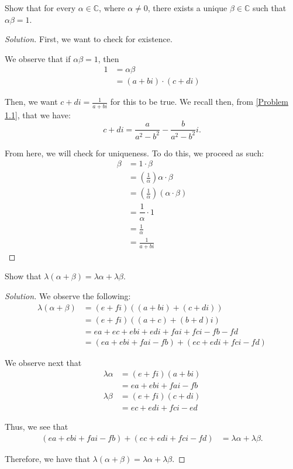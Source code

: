\documentclass[openany]{book}
\newenvironment{solution}{\begin{proof}[Solution]}{\end{proof}}
\newcommand{\CC}{\mathbb{C}}
\begin{document}
	\begin{hw}
		Show that for every $\alpha \in \CC$, where $\alpha \neq 0$, there exists a unique $\beta \in \CC$ such that $\alpha\beta = 1$.
	\end{hw}
	\begin{solution}
		First, we want to check for existence.
		
		We observe that if $\alpha\beta = 1$, then
		\begin{align*}
			1 &= \alpha\beta \\
			&= (a+bi) \cdot (c + di)
		\end{align*}
	
		Then, we want $c + di = \frac{1}{a+bi}$ for this to be true. We recall then, from \ref{Problem 1.1}, that we have:
		\begin{equation*}
			c + di = \frac{a}{a^{2} - b^{2}} - \frac{b}{a^{2} - b^{2}}i.
		\end{equation*}
	
		From here, we will check for uniqueness. To do this, we proceed as such:
		\begin{align*}
			\beta &= 1 \cdot \beta \\
			&= \left( \frac{1}{\alpha} \right)\alpha \cdot \beta \\
			&= \left( \frac{1}{\alpha} \right)(\alpha \cdot \beta) \\
			&= \dfrac{1}{\alpha} \cdot 1 \\
			&= \frac{1}{\alpha} \\
			&= \frac{1}{a + bi}
		\end{align*}
	\end{solution}

	\begin{hw}
		Show that $\lambda(\alpha + \beta) = \lambda\alpha + \lambda\beta$.
	\end{hw}
	\begin{solution}
		We observe the following:
		\begin{align*}
			\lambda(\alpha + \beta) &= (e+fi)( (a+bi) + (c+di)) \\
			&= (e+fi) ( (a+c) + (b+d)i ) \\
			&= ea + ec + ebi + edi + fai + fci - fb - fd \\
			&= (ea + ebi + fai - fb) + (ec + edi + fci - fd)
		\end{align*}
	
		We observe next that
		\begin{align*}
			\lambda\alpha &= (e+fi)(a +bi) \\
			&= ea + ebi + fai - fb \\
			\lambda\beta &= (e+fi)(c+di) \\
			&= ec + edi + fci - ed
		\end{align*}
	
		Thus, we see that
		\begin{align*}
			(ea + ebi + fai - fb) + (ec + edi + fci - fd) &= \lambda\alpha + \lambda\beta.
		\end{align*}
	
		Therefore, we have that $\lambda(\alpha + \beta) = \lambda\alpha + \lambda\beta$.
	\end{solution}
	
\end{document}
